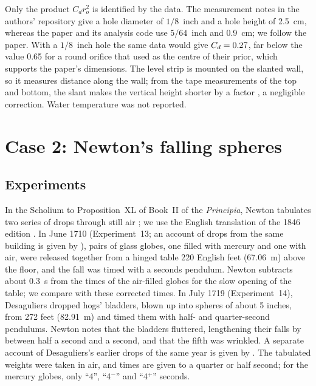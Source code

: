 \documentclass{jfm}
\begin{document}
Only the product $C_d r_o^2$ is identified by the data. The measurement notes in the authors' repository
\citep{FabusolaData} give a hole diameter of $1/8$~inch and a hole height of 2.5~cm, whereas the paper and its
analysis code use $5/64$~inch and 0.9~cm; we follow the paper. With a $1/8$~inch hole the same data would give
$C_d = 0.27$, far below the value 0.65 for a round orifice \citep{Hicks2014} that \citet{Fabusola2025} used
as the centre of their prior, which supports the paper's dimensions. The level strip is mounted on the slanted wall, so it measures distance along the wall; from
the tape measurements of the top and bottom, the slant makes the vertical height shorter by a factor
\SlantFactor, a negligible correction. Water temperature was not
reported.

\section{Case 2: Newton's falling spheres}\label{sec:drops}

\subsection{Experiments}

In the Scholium to Proposition~XL of Book~II of the \emph{Principia}, Newton tabulates two series of drops through
still air \citep{Newton1726}; we use the English translation of the 1846 edition \citep{Newton1846}. In June 1710
(Experiment~13; an account of drops from the same building is given by \citealt{Hauksbee1710}), pairs of glass
globes, one filled with mercury and one with air, were released together from a hinged table 220 English feet
(67.06~m) above the floor, and the fall was timed with a seconds pendulum. Newton subtracts about 0.3~s from the
times of the air-filled globes for the slow opening of the table; we compare with these corrected times. In July
1719 (Experiment~14), Desaguliers dropped hogs' bladders, blown up into spheres of about 5 inches, from 272 feet
(82.91~m) and timed them with half- and quarter-second pendulums. Newton notes that the bladders fluttered,
lengthening their falls by between half a second and a second, and that the fifth was wrinkled. A separate account
of Desaguliers's earlier drops of the same year is given by \citet{Desaguliers1719}. The tabulated weights were
taken in air, and times are given to a quarter or half second; for the mercury globes, only ``4'', ``4$^-$'' and
``4$^+$'' seconds.
\end{document}
